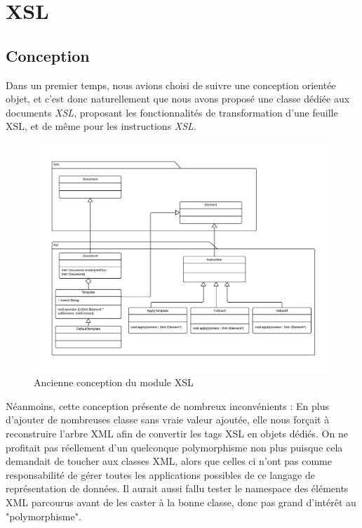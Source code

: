 \chapter{XSL}

\section{Conception}

Dans un premier temps, nous avions choisi de suivre une conception orientée objet, et c'est donc
naturellement que nous avons proposé une classe dédiée aux documents \textit{XSL}, proposant les
fonctionnalités de transformation d'une feuille XSL, et de même pour les instructions \textit{XSL}.

\begin{figure}[h!]
    \centering
    \includegraphics[width=\linewidth]{images/xsl-uml-old.pdf}
    \caption{Ancienne conception du module XSL}
    \label{oldXslClassDiagram}
\end{figure}

Néanmoins, cette conception présente de nombreux inconvénients : En plus d'ajouter de nombreuses classe sans vraie valeur ajoutée, elle
nous forçait à reconstruire l'arbre XML afin de convertir les tags XSL en objets dédiés. On ne profitait pas réellement d'un quelconque
polymorphisme non plus puisque cela demandait de toucher aux classes XML, alors que celles ci n'ont pas comme responsabilité de gérer toutes
les applications possibles de ce langage de représentation de données. Il aurait aussi fallu tester le namespace des éléments XML parcourus
avant de les caster à la bonne classe, donc pas grand d’intérêt au "polymorphisme".

